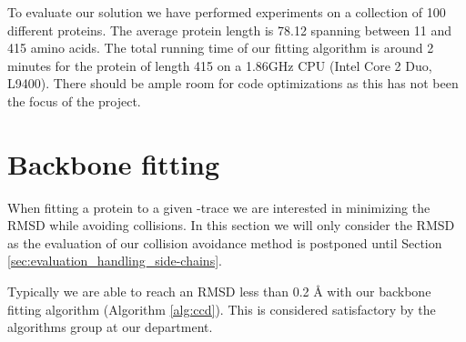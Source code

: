 To evaluate our solution we have performed experiments on a collection of 100 different proteins.
The average protein length is 78.12 spanning between 11 and 415 amino acids.
The total running time of our fitting algorithm is around 2 minutes for the protein of length 415 on a 1.86GHz CPU (Intel Core 2 Duo, L9400).
There should be ample room for code optimizations as this has not been the focus of the project.

\section{Backbone fitting}
When fitting a protein to a given \Ca-trace we are interested in minimizing the RMSD while avoiding collisions.
In this section we will only consider the RMSD as the evaluation of our collision avoidance method  is postponed until Section \ref{sec:evaluation_handling_side-chains}. 

Typically we are able to reach an RMSD less than 0.2 Å with our backbone fitting algorithm (Algorithm \ref{alg:ccd}).
This is considered satisfactory by the algorithms group at our department.
